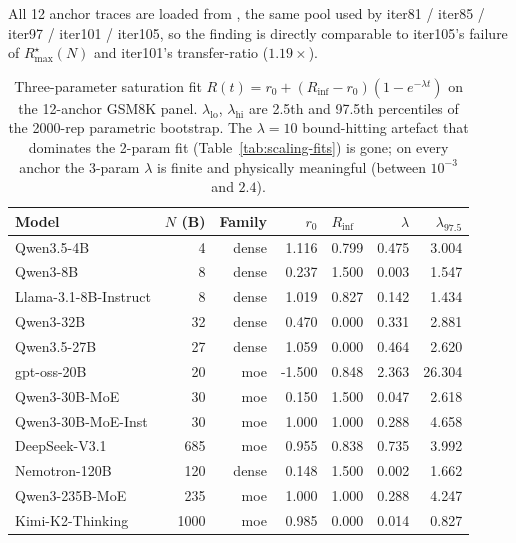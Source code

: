 All 12 anchor traces are loaded from
,
the same pool used by iter81 / iter85 / iter97 / iter101 / iter105,
so the finding is directly comparable to iter105's failure of
$R_\mathrm{max}^\star(N)$ and iter101's transfer-ratio
($1.19\times$).

\begin{table}[t]
\centering
\small
\caption{Three-parameter saturation fit
$R(t) = r_0 + (R_\mathrm{inf} - r_0)(1 - e^{-\lambda t})$
on the 12-anchor GSM8K panel.
$\lambda_\mathrm{lo}$, $\lambda_\mathrm{hi}$ are 2.5th and 97.5th
percentiles of the 2000-rep parametric bootstrap.
The $\lambda = 10$ bound-hitting artefact that dominates the 2-param
fit (Table~\ref{tab:scaling-fits}) is gone; on every anchor the
3-param $\lambda$ is finite and physically meaningful (between
$10^{-3}$ and $2.4$).
\label{tab:iter109-sat}}
\begin{tabular}{lrrrlrr}
\toprule
Model & $N$ (B) & Family &
       $r_0$ & $R_\mathrm{inf}$ &
       $\lambda$ & $\lambda_{97.5}$ \\
\midrule
Qwen3.5-4B            &    4 & dense &  1.116 & 0.799 &  0.475 &  3.004 \\
Qwen3-8B              &    8 & dense &  0.237 & 1.500 &  0.003 &  1.547 \\
Llama-3.1-8B-Instruct &    8 & dense &  1.019 & 0.827 &  0.142 &  1.434 \\
Qwen3-32B             &   32 & dense &  0.470 & 0.000 &  0.331 &  2.881 \\
Qwen3.5-27B           &   27 & dense &  1.059 & 0.000 &  0.464 &  2.620 \\
gpt-oss-20B           &   20 & moe   & -1.500 & 0.848 &  2.363 & 26.304 \\
Qwen3-30B-MoE         &   30 & moe   &  0.150 & 1.500 &  0.047 &  2.618 \\
Qwen3-30B-MoE-Inst    &   30 & moe   &  1.000 & 1.000 &  0.288 &  4.658 \\
DeepSeek-V3.1         &  685 & moe   &  0.955 & 0.838 &  0.735 &  3.992 \\
Nemotron-120B         &  120 & dense &  0.148 & 1.500 &  0.002 &  1.662 \\
Qwen3-235B-MoE        &  235 & moe   &  1.000 & 1.000 &  0.288 &  4.247 \\
Kimi-K2-Thinking      & 1000 & moe   &  0.985 & 0.000 &  0.014 &  0.827 \\
\bottomrule
\end{tabular}
\end{table}

